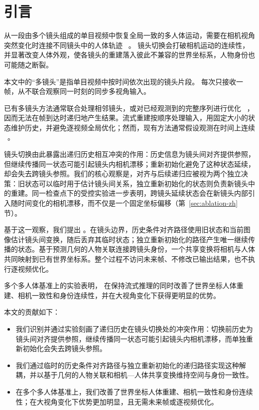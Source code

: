 \section{引言}

从一段由多个镜头组成的单目视频中恢复全局一致的多人体运动，需要在相机视角突然变化时连接不同镜头中的人体轨迹
~\citep{pavlakos2022multishot,zhang2025humanmm,on2026multithumbs}。
镜头切换会打破相机运动的连续性，并显著改变人体外观，使各镜头的重建落入彼此不兼容的世界坐标系，人物身份也可能随之断裂。

本文中的“多镜头”是指单目视频中按时间依次出现的镜头片段。\method{} 每次只接收一帧，从不联合观察同一时刻的同步多视角输入。

已有多镜头方法通常联合处理相邻镜头，或对已经观测到的完整序列进行优化
~\citep{zhang2025humanmm,on2026multithumbs}，因而无法在帧到达时递归地产生结果。流式重建按顺序处理输入，用固定大小的状态维护历史，并避免逐视频全局优化；然而，现有方法通常假设观测在时间上连续
~\citep{wang2025cut3r,chen2026human3r,zhao2026onlinehmr}。

镜头切换由此暴露出递归历史相互冲突的作用：历史信息为镜头间对齐提供参照，但继续传播同一状态可能引起镜头内相机漂移；重新初始化避免了这种状态延续，却会失去跨镜头参照。我们的核心观察是，对齐与后续递归应被视为两个独立决策：旧状态可以临时用于估计镜头间关系，独立重新初始化的状态则负责新镜头中的重建。同一检查点下的受控实验进一步表明，跨镜头延续状态会在新镜头内部引入随时间变化的相机漂移，而不仅是一个固定坐标偏移（第~\ref{sec:ablation-zh} 节）。

基于这一观察，我们提出 \method{}。在镜头边界，历史条件对齐路径使用旧状态和当前图像估计镜头间变换，随后丢弃其临时状态；独立重新初始化的路径产生唯一继续传播的状态。基于预测几何的人物关联连接跨镜头身份，一个共享变换将相机与人体共同映射到已有世界坐标系。整个过程不访问未来帧、不修改已输出结果，也不执行逐视频优化。

多个多人体基准上的实验表明，\method{} 在保持流式推理的同时改善了世界坐标人体重建、相机一致性和身份连续性，并在大视角变化下获得更明显的优势。

本文的贡献如下：

\begin{itemize}
  \item 我们识别并通过实验刻画了递归历史在镜头切换处的冲突作用：切换前历史为镜头间对齐提供参照，继续传播同一状态可能引起镜头内相机漂移，而单独重新初始化会失去跨镜头参照。
  \item 我们通过临时的历史条件对齐路径与独立重新初始化的递归路径实现这种解耦，并以基于几何的人物关联和相机—人体共享变换维持空间与身份一致性。
  \item 在多个多人体基准上，我们改善了世界坐标人体重建、相机一致性和身份连续性；在大视角变化下优势更加明显，且无需未来帧或逐视频优化。
\end{itemize}
